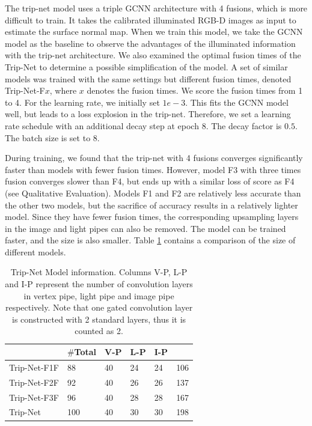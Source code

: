 The trip-net model uses a triple GCNN architecture with 4 fusions, which is more difficult to train. It takes the calibrated illuminated RGB-D images as input to estimate the surface normal map. When we train this model, we take the GCNN model as the baseline to observe the advantages of the illuminated information with the trip-net architecture.
We also examined the optimal fusion times of the Trip-Net to determine a possible simplification of the model. A set of similar models was trained with the same settings but different fusion times, denoted Trip-Net-F$ x $, where $ x $ denotes the fusion times. We score the fusion times from 1 to 4. For the learning rate, we initially set $ 1e-3 $. This fits the GCNN model well, but leads to a loss explosion in the trip-net. Therefore, we set a learning rate schedule with an additional decay step at epoch 8. The decay factor is $ 0.5$. The batch size is set to 8.

During training, we found that the trip-net with 4 fusions converges significantly faster than models with fewer fusion times. However, model F3 with three times fusion converges slower than F4, but ends up with a similar loss of score as F4 (see Qualitative Evaluation). Models F1 and F2 are relatively less accurate than the other two models, but the sacrifice of accuracy results in a relatively lighter model. Since they have fewer fusion times, the corresponding upsampling layers in the image and light pipes can also be removed. The model can be trained faster, and the size is also smaller. Table \ref{tab:trip-net-size-compare} contains a comparison of the size of different models.



\begin{table}[H]
	\centering
	\captionsetup{width=\linewidth}
	\begin{tabular}{l | l l l l l }
		\toprule
		\tabhead{Model} & $ \# $\textbf{Total} &\textbf{ V-P} & \textbf{L-P} & \textbf{I-P} & \tabhead{Size /MB}\\
		\midrule
		Trip-Net-F1F  			& 88 &  40 & 24 & 24 & 106\\ 
		\hline
		Trip-Net-F2F 			& 92 & 40 & 26 & 26 & 137 \\ 
		\hline
		Trip-Net-F3F 			& 96 & 40 & 28 & 28 & 167 \\
		\hline
		Trip-Net 				& 100 & 40 & 30 & 30 & 198\\
		\bottomrule
	\end{tabular}
	\caption{Trip-Net Model information. Columns V-P, L-P and I-P represent the number of convolution layers in vertex pipe, light pipe and image pipe respectively. Note that one gated convolution layer is constructed with 2 standard layers, thus it is counted as 2. }	
	\label{tab:trip-net-size-compare}
\end{table}


